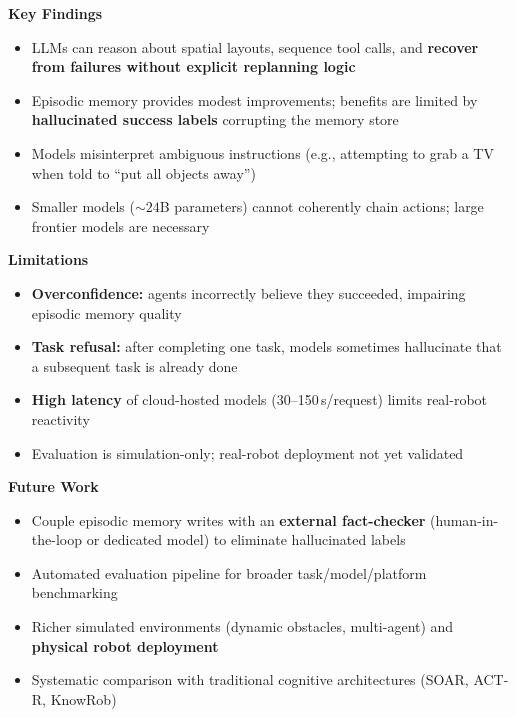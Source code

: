 \documentclass[../hbrs-poster.tex]{subfiles}
\begin{document}
    {
        \textbf{Key Findings}

        \begin{itemize}
            \item LLMs can reason about spatial layouts, sequence tool calls, and \textbf{recover from failures without explicit replanning logic}
            \item Episodic memory provides modest improvements; benefits are limited by \textbf{hallucinated success labels} corrupting the memory store
            \item Models misinterpret ambiguous instructions (e.g., attempting to grab a TV when told to ``put all objects away'')
            \item Smaller models (${\sim}24$B parameters) cannot coherently chain actions; large frontier models are necessary
        \end{itemize}

        \vspace{0.8em}
        \textbf{Limitations}

        \begin{itemize}
            \item \textbf{Overconfidence:} agents incorrectly believe they succeeded, impairing episodic memory quality
            \item \textbf{Task refusal:} after completing one task, models sometimes hallucinate that a subsequent task is already done
            \item \textbf{High latency} of cloud-hosted models (30--150\,s/request) limits real-robot reactivity
            \item Evaluation is simulation-only; real-robot deployment not yet validated
        \end{itemize}

        \vspace{0.8em}
        \textbf{Future Work}

        \begin{itemize}
            \item Couple episodic memory writes with an \textbf{external fact-checker} (human-in-the-loop or dedicated model) to eliminate hallucinated labels
            \item Automated evaluation pipeline for broader task/model/platform benchmarking
            \item Richer simulated environments (dynamic obstacles, multi-agent) and \textbf{physical robot deployment}
            \item Systematic comparison with traditional cognitive architectures (SOAR, ACT-R, KnowRob)
        \end{itemize}
    }
\end{document}
